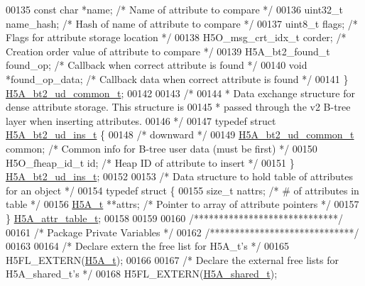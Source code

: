 \begin{DoxyCode}
00135     \textcolor{keyword}{const} \textcolor{keywordtype}{char}  *name;                  \textcolor{comment}{/* Name of attribute to compare      */}
00136     uint32\_t    name\_hash;              \textcolor{comment}{/* Hash of name of attribute to compare */}
00137     uint8\_t     flags;                  \textcolor{comment}{/* Flags for attribute storage location */}
00138     H5O\_msg\_crt\_idx\_t corder;           \textcolor{comment}{/* Creation order value of attribute to compare */}
00139     H5A\_bt2\_found\_t found\_op;           \textcolor{comment}{/* Callback when correct attribute is found */}
00140     \textcolor{keywordtype}{void}        *found\_op\_data;         \textcolor{comment}{/* Callback data when correct attribute is found */}
00141 \} \hyperlink{struct_h5_a__bt2__ud__common__t}{H5A\_bt2\_ud\_common\_t};
00142 
00143 \textcolor{comment}{/*}
00144 \textcolor{comment}{ * Data exchange structure for dense attribute storage.  This structure is}
00145 \textcolor{comment}{ * passed through the v2 B-tree layer when inserting attributes.}
00146 \textcolor{comment}{ */}
00147 \textcolor{keyword}{typedef} \textcolor{keyword}{struct }\hyperlink{struct_h5_a__bt2__ud__ins__t}{H5A\_bt2\_ud\_ins\_t} \{
00148     \textcolor{comment}{/* downward */}
00149     \hyperlink{struct_h5_a__bt2__ud__common__t}{H5A\_bt2\_ud\_common\_t} common;         \textcolor{comment}{/* Common info for B-tree user data (must be
       first) */}
00150     H5O\_fheap\_id\_t id;                  \textcolor{comment}{/* Heap ID of attribute to insert    */}
00151 \} \hyperlink{struct_h5_a__bt2__ud__ins__t}{H5A\_bt2\_ud\_ins\_t};
00152 
00153 \textcolor{comment}{/* Data structure to hold table of attributes for an object */}
00154 \textcolor{keyword}{typedef} \textcolor{keyword}{struct }\{
00155     \textcolor{keywordtype}{size\_t}      nattrs;         \textcolor{comment}{/* # of attributes in table */}
00156     \hyperlink{struct_h5_a__t}{H5A\_t}       **attrs;        \textcolor{comment}{/* Pointer to array of attribute pointers */}
00157 \} \hyperlink{struct_h5_a__attr__table__t}{H5A\_attr\_table\_t};
00158 
00159 
00160 \textcolor{comment}{/*****************************/}
00161 \textcolor{comment}{/* Package Private Variables */}
00162 \textcolor{comment}{/*****************************/}
00163 
00164 \textcolor{comment}{/* Declare extern the free list for H5A\_t's */}
00165 H5FL\_EXTERN(\hyperlink{struct_h5_a__t}{H5A\_t});
00166 
00167 \textcolor{comment}{/* Declare the external free lists for H5A\_shared\_t's */}
00168 H5FL\_EXTERN(\hyperlink{struct_h5_a__shared__t}{H5A\_shared\_t});

\end{DoxyCode}
